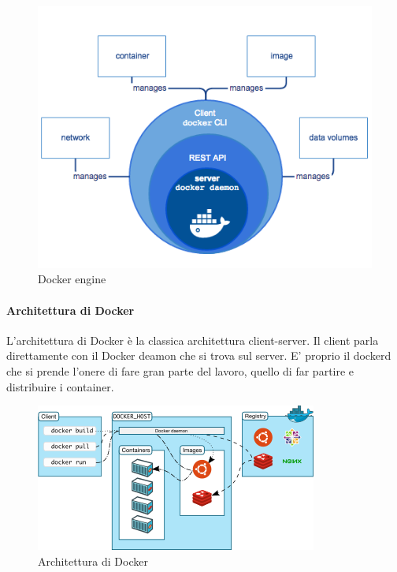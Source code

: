 \begin{figure}[h!]
	\centering
	\includegraphics[width=\textwidth,keepaspectratio=true]{capitoli/imgs/dockerThinking.png}
	\caption{Docker engine}
\end{figure}

\paragraph{Architettura di Docker}
L'architettura di Docker è la classica architettura client-server. Il client parla direttamente con il Docker deamon che si trova sul server. E' proprio il dockerd che si prende l'onere di fare gran parte del lavoro, quello di far partire e distribuire i container.
\begin{figure}[h!]
	\centering
	\includegraphics[width=\textwidth,keepaspectratio=true]{capitoli/imgs/architecturedocker.png}
	\caption{Architettura di Docker}
\end{figure}

